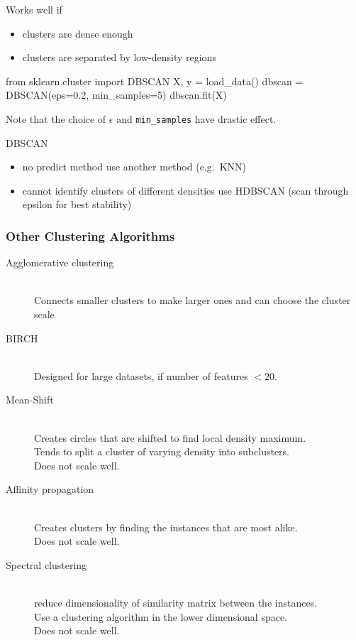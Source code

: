 Works well if
\begin{itemize}
    \item clusters are dense enough
    \item clusters are separated by low-density regions
\end{itemize}

\begin{python}
    from sklearn.cluster import DBSCAN
    X, y = load_data()
    dbscan = DBSCAN(eps=0.2, min_samples=5)
    dbscan.fit(X)
\end{python}
Note that the choice of $\epsilon$ and \verb;min_samples; have drastic effect.

DBSCAN
\begin{itemize}
    \item no predict method \Arrow use another method (e.g.\ KNN)
    \item cannot identify clusters of different densities \arrow use HDBSCAN (scan through epsilon for best stability)
\end{itemize}

\subsubsection{Other Clustering Algorithms}
\begin{description}
    \item[Agglomerative clustering] \hfill\\
        Connects smaller clusters to make larger ones and can choose the cluster scale
    \item[BIRCH] \hfill\\
        Designed for large datasets, if number of features $<20$.
    \item[Mean-Shift] \hfill\\
        Creates circles that are shifted to find local density maximum.\\
        Tends to split a cluster of varying density into subclusters.\\
        Does not scale well.
    \item[Affinity propagation] \hfill\\
        Creates clusters by finding the instances that are most alike.\\
        Does not scale well.
    \item[Spectral clustering] \hfill\\
        reduce dimensionality of similarity matrix between the instances.\\
        Use a clustering algorithm in the lower dimensional space.\\
        Does not scale well.
\end{description}


